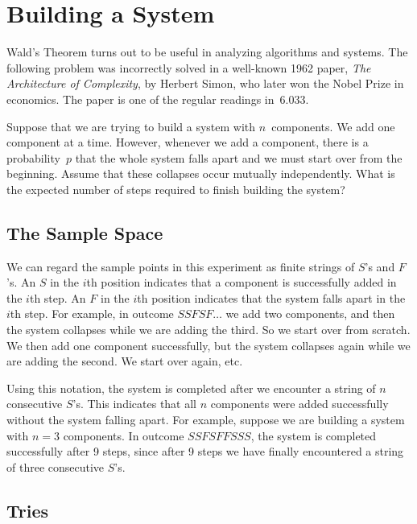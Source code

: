 \documentclass[11pt,twoside]{article}
\begin{document}

\section{Building a System}

Wald's Theorem turns out to be useful in analyzing algorithms and
systems.  The following problem was incorrectly solved in a well-known
1962 paper, \emph{The Architecture of Complexity}, by Herbert Simon,
who later won the Nobel Prize in economics.  The paper is one of the
regular readings in~6.033.

Suppose that we are trying to build a system with $n$~components.  We
add one component at a time.  However, whenever we add a component,
there is a probability~$p$ that the whole system falls apart and we
must start over from the beginning.  Assume that these collapses occur
mutually independently.  What is the expected number of steps required
to finish building the system?

\subsection{The Sample Space}

We can regard the sample points in this experiment as finite strings
of $S$'s and $F$'s.  An $S$ in the $i$th position indicates that a
component is successfully added in the $i$th step.  An $F$ in the
$i$th position indicates that the system falls apart in the $i$th
step.  For example, in outcome $SSFSF\ldots$ we add two components,
and then the system collapses while we are adding the third.  So we
start over from scratch.  We then add one component successfully, but
the system collapses again while we are adding the second.  We start
over again, etc.

Using this notation, the system is completed after we encounter a string
of $n$ consecutive $S$'s.  This indicates that all $n$ components were
added successfully without the system falling apart.  For example, suppose
we are building a system with $n=3$ components.  In outcome $SSFSFFSSS$,
the system is completed successfully after 9 steps, since after 9 steps we
have finally encountered a string of three consecutive $S$'s.

\subsection{Tries}
\end{document}
